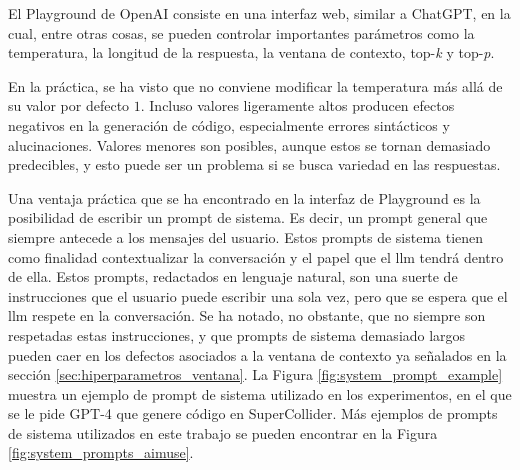 El Playground de OpenAI consiste en una interfaz web, similar a ChatGPT, en la cual, entre otras cosas, se pueden controlar importantes parámetros como la temperatura, la longitud de la respuesta, la ventana de contexto, top-\emph{k} y top-\emph{p}. 

En la práctica, se ha visto que no conviene modificar la temperatura más allá de su valor por defecto $1$. Incluso valores ligeramente altos producen efectos negativos en la generación de código, especialmente errores sintácticos y alucinaciones. Valores menores son posibles, aunque estos se tornan demasiado predecibles, y esto puede ser un problema si se busca variedad en las respuestas.

Una ventaja práctica que se ha encontrado en la interfaz de Playground es la posibilidad de escribir un prompt de sistema. Es decir, un prompt general que siempre antecede a los mensajes del usuario. Estos prompts de sistema tienen como finalidad contextualizar la conversación y el papel que el \gls{llm} tendrá dentro de ella. Estos prompts, redactados en lenguaje natural, son una suerte de instrucciones que el usuario puede escribir una sola vez, pero que se espera que el \gls{llm} respete en la conversación. Se ha notado, no obstante, que no siempre son respetadas estas instrucciones, y que prompts de sistema demasiado largos pueden caer en los defectos asociados a la ventana de contexto ya señalados en la sección \ref{sec:hiperparametros_ventana}. La Figura \ref{fig:system_prompt_example} muestra un ejemplo de prompt de sistema utilizado en los experimentos, en el que se le pide GPT-4 que genere código en SuperCollider. Más ejemplos de prompts de sistema utilizados en este trabajo se pueden encontrar en la Figura \ref{fig:system_prompts_aimuse}.

